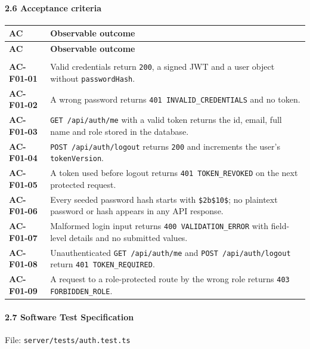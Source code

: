 \documentclass[12pt,a4paper]{article}
\begin{document}
\paragraph*{2.6 Acceptance criteria}
{\setlength{\tabcolsep}{3pt}\renewcommand{\arraystretch}{1.08}\small
\begin{longtable}{@{}>{\raggedright\arraybackslash}p{}>{\raggedright\arraybackslash}p{}@{}}
\toprule
\textbf{AC} & \textbf{Observable outcome} \\
\midrule
\endfirsthead
\toprule
\textbf{AC} & \textbf{Observable outcome} \\
\midrule
\endhead
\midrule
\multicolumn{2}{r}{\footnotesize\textit{Continued on next page}}\\
\endfoot
\bottomrule
\endlastfoot
\textbf{AC-F01-01} & Valid credentials return \texttt{200}, a signed JWT and a user object without \texttt{passwordHash}. \\
\textbf{AC-F01-02} & A wrong password returns \texttt{401 INVALID\_CREDENTIALS} and no token. \\
\textbf{AC-F01-03} & \texttt{GET /api/auth/me} with a valid token returns the id, email, full name and role stored in the database. \\
\textbf{AC-F01-04} & \texttt{POST /api/auth/logout} returns \texttt{200} and increments the user's \texttt{tokenVersion}. \\
\textbf{AC-F01-05} & A token used before logout returns \texttt{401 TOKEN\_REVOKED} on the next protected request. \\
\textbf{AC-F01-06} & Every seeded password hash starts with \texttt{\$2b\$10\$}; no plaintext password or hash appears in any API response. \\
\textbf{AC-F01-07} & Malformed login input returns \texttt{400 VALIDATION\_ERROR} with field-level details and no submitted values. \\
\textbf{AC-F01-08} & Unauthenticated \texttt{GET /api/auth/me} and \texttt{POST /api/auth/logout} return \texttt{401 TOKEN\_REQUIRED}. \\
\textbf{AC-F01-09} & A request to a role-protected route by the wrong role returns \texttt{403 FORBIDDEN\_ROLE}. \\
\end{longtable}}

\paragraph*{2.7 Software Test Specification}
File: \texttt{server/tests/auth.test.ts}
\end{document}
